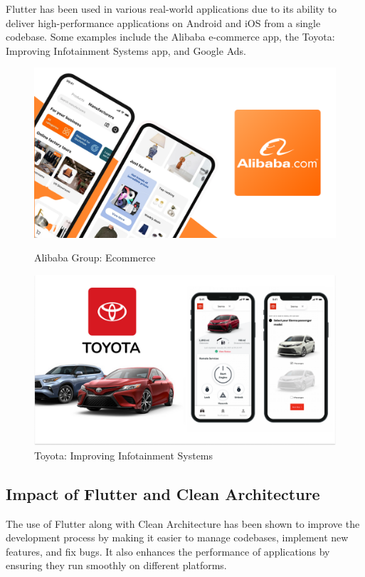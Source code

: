 Flutter has been used in various real-world applications due to its ability to deliver high-performance applications on Android and iOS from a single codebase. Some examples include the Alibaba e-commerce app, the Toyota: Improving Infotainment Systems app, and Google Ads.

\begin{figure}[H]
    \begin{minipage}{0.48\textwidth}
        \centering
        \includegraphics[width=1\linewidth]{../images/alibaba-commerce.png}
        \caption{Alibaba Group: Ecommerce}\label{Fig:AGEAPP}
    \end{minipage}\hfill
    \begin {minipage}{0.48\textwidth}
    \centering
    \includegraphics[width=\linewidth]{../images/TOYOTA-1.png}
    \caption{Toyota: Improving Infotainment Systems}\label{Fig:TIISAPP}
    \end{minipage}
\end{figure}
\subsection{Impact of Flutter and Clean Architecture}
The use of Flutter along with Clean Architecture has been shown to improve the development process by making it easier to manage codebases, implement new features, and fix bugs. It also enhances the performance of applications by ensuring they run smoothly on different platforms.

